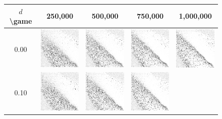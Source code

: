 \begin{figure}[h]
	\centering

	\begin{tabular}{c | c c c c}
		$d$\textbackslash game & 250,000 & 500,000 & 750,000 & 1,000,000 \\
		\hline
		0.00 &
			\includegraphics[width=2cm]{images/findings/experiments/decay/decay_000_250.png} & %
			\includegraphics[width=2cm]{images/findings/experiments/decay/decay_000_500.png} & %
			\includegraphics[width=2cm]{images/findings/experiments/decay/decay_000_750.png} & %
			\includegraphics[width=2cm]{images/findings/experiments/decay/decay_000_1mm.png} \\ %
		0.10 & 
			\includegraphics[width=2cm]{images/findings/experiments/decay/decay_010_250.png} & %
			\includegraphics[width=2cm]{images/findings/experiments/decay/decay_010_500.png} & %
			\includegraphics[width=2cm]{images/findings/experiments/decay/decay_010_750.png} & %

\end{tabular}
\end{figure}
